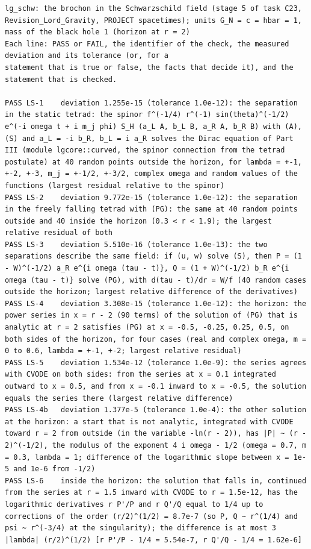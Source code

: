 \documentclass[
  10pt,
]{article}
\begin{document}
\begin{verbatim}
lg_schw: the brochon in the Schwarzschild field (stage 5 of task C23, Revision_Lord_Gravity, PROJECT spacetimes); units G_N = c = hbar = 1, mass of the black hole 1 (horizon at r = 2)
Each line: PASS or FAIL, the identifier of the check, the measured deviation and its tolerance (or, for a
statement that is true or false, the facts that decide it), and the statement that is checked.

PASS LS-1    deviation 1.255e-15 (tolerance 1.0e-12): the separation in the static tetrad: the spinor f^(-1/4) r^(-1) sin(theta)^(-1/2) e^(-i omega t + i m_j phi) S_H (a_L A, b_L B, a_R A, b_R B) with (A), (S) and a_L = -i b_R, b_L = i a_R solves the Dirac equation of Part III (module lgcore::curved, the spinor connection from the tetrad postulate) at 40 random points outside the horizon, for lambda = +-1, +-2, +-3, m_j = +-1/2, +-3/2, complex omega and random values of the functions (largest residual relative to the spinor)
PASS LS-2    deviation 9.772e-15 (tolerance 1.0e-12): the separation in the freely falling tetrad with (PG): the same at 40 random points outside and 40 inside the horizon (0.3 < r < 1.9); the largest relative residual of both
PASS LS-3    deviation 5.510e-16 (tolerance 1.0e-13): the two separations describe the same field: if (u, w) solve (S), then P = (1 - W)^(-1/2) a_R e^{i omega (tau - t)}, Q = (1 + W)^(-1/2) b_R e^{i omega (tau - t)} solve (PG), with d(tau - t)/dr = W/f (40 random cases outside the horizon; largest relative difference of the derivatives)
PASS LS-4    deviation 3.308e-15 (tolerance 1.0e-12): the horizon: the power series in x = r - 2 (90 terms) of the solution of (PG) that is analytic at r = 2 satisfies (PG) at x = -0.5, -0.25, 0.25, 0.5, on both sides of the horizon, for four cases (real and complex omega, m = 0 to 0.6, lambda = +-1, +-2; largest relative residual)
PASS LS-5    deviation 1.534e-12 (tolerance 1.0e-9): the series agrees with CVODE on both sides: from the series at x = 0.1 integrated outward to x = 0.5, and from x = -0.1 inward to x = -0.5, the solution equals the series there (largest relative difference)
PASS LS-4b   deviation 1.377e-5 (tolerance 1.0e-4): the other solution at the horizon: a start that is not analytic, integrated with CVODE toward r = 2 from outside (in the variable -ln(r - 2)), has |P| ~ (r - 2)^(-1/2), the modulus of the exponent 4 i omega - 1/2 (omega = 0.7, m = 0.3, lambda = 1; difference of the logarithmic slope between x = 1e-5 and 1e-6 from -1/2)
PASS LS-6    inside the horizon: the solution that falls in, continued from the series at r = 1.5 inward with CVODE to r = 1.5e-12, has the logarithmic derivatives r P'/P and r Q'/Q equal to 1/4 up to corrections of the order (r/2)^(1/2) = 8.7e-7 (so P, Q ~ r^(1/4) and psi ~ r^(-3/4) at the singularity); the difference is at most 3 |lambda| (r/2)^(1/2) [r P'/P - 1/4 = 5.54e-7, r Q'/Q - 1/4 = 1.62e-6]

\end{verbatim}
\end{document}
